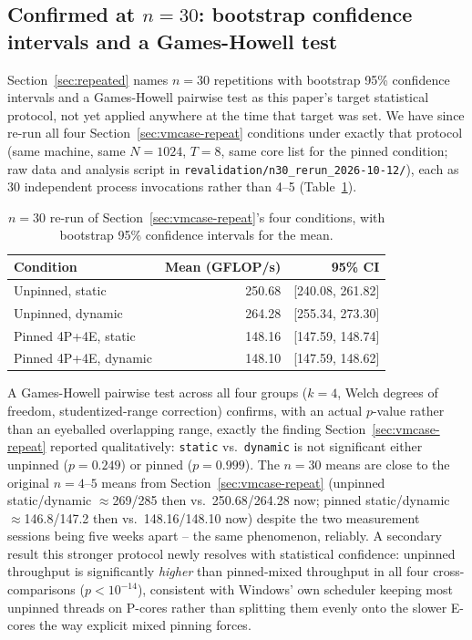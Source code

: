 \documentclass[acmsmall]{acmart}
\begin{document}
\subsection{Confirmed at \texorpdfstring{$n=30$}{n=30}: bootstrap confidence intervals and a Games-Howell test}
\label{sec:vmcase-n30}
Section~\ref{sec:repeated} names $n{=}30$ repetitions with bootstrap
95\% confidence intervals and a Games-Howell pairwise test as this
paper's target statistical protocol, not yet applied anywhere at the
time that target was set. We have since re-run all four
Section~\ref{sec:vmcase-repeat} conditions under exactly that protocol
(same machine, same $N{=}1024$, $T{=}8$, same core list for the pinned
condition; raw data and analysis script in
\texttt{revalidation/n30\_rerun\_2026-10-12/}), each as 30 independent
process invocations rather than 4--5 (Table~\ref{tab:n30}).

\begin{table}[h]
\centering
\small
\caption{$n{=}30$ re-run of Section~\ref{sec:vmcase-repeat}'s four
conditions, with bootstrap 95\% confidence intervals for the mean.}
\label{tab:n30}
\begin{tabular}{lrr}
\toprule
Condition & Mean (GFLOP/s) & 95\% CI \\
\midrule
Unpinned, static       & 250.68 & [240.08, 261.82] \\
Unpinned, dynamic      & 264.28 & [255.34, 273.30] \\
Pinned 4P+4E, static   & 148.16 & [147.59, 148.74] \\
Pinned 4P+4E, dynamic  & 148.10 & [147.59, 148.62] \\
\bottomrule
\end{tabular}
\end{table}

A Games-Howell pairwise test across all four groups ($k{=}4$, Welch
degrees of freedom, studentized-range correction) confirms, with an
actual $p$-value rather than an eyeballed overlapping range, exactly
the finding Section~\ref{sec:vmcase-repeat} reported qualitatively:
\texttt{static} vs.\ \texttt{dynamic} is not significant either
unpinned ($p{=}0.249$) or pinned ($p{=}0.999$). The $n{=}30$ means are
close to the original $n{=}4$--$5$ means from
Section~\ref{sec:vmcase-repeat} (unpinned static/dynamic $\approx$269/285
then vs.\ 250.68/264.28 now; pinned static/dynamic $\approx$146.8/147.2
then vs.\ 148.16/148.10 now) despite the two measurement sessions being
five weeks apart -- the same phenomenon, reliably. A secondary result
this stronger protocol newly resolves with statistical confidence:
unpinned throughput is significantly \emph{higher} than pinned-mixed
throughput in all four cross-comparisons ($p<10^{-14}$), consistent
with Windows' own scheduler keeping most unpinned threads on P-cores
rather than splitting them evenly onto the slower E-cores the way
explicit mixed pinning forces.
\end{document}
